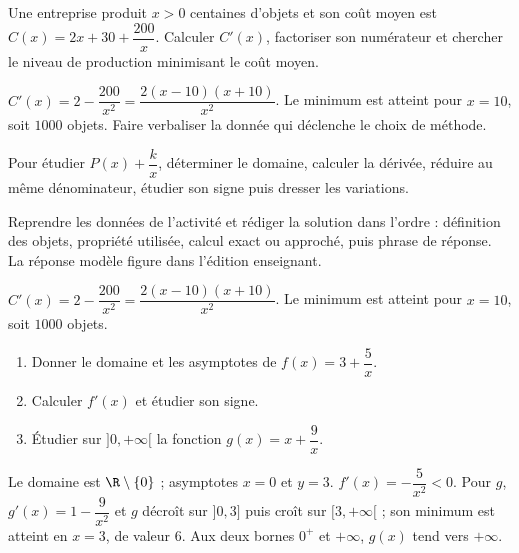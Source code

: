 \begin{activity}
Une entreprise produit $x>0$ centaines d'objets et son coût moyen est $C(x)=2x+30+\dfrac{200}{x}$. Calculer $C'(x)$, factoriser son numérateur et chercher le niveau de production minimisant le coût moyen.

\end{activity}
\begin{solution}$C'(x)=2-\dfrac{200}{x^2}=\dfrac{2(x-10)(x+10)}{x^2}$. Le minimum est atteint pour $x=10$, soit $\num{1000}$ objets. Faire verbaliser la donnée qui déclenche le choix de méthode.\end{solution}

\begin{summary}Pour étudier $P(x)+\dfrac{k}{x}$, déterminer le domaine, calculer la dérivée, réduire au même dénominateur, étudier son signe puis dresser les variations.\end{summary}

\begin{example}
Reprendre les données de l'activité et rédiger la solution dans l'ordre : définition des objets, propriété utilisée, calcul exact ou approché, puis phrase de réponse. La réponse modèle figure dans l'édition enseignant.
\end{example}
\begin{solution}$C'(x)=2-\dfrac{200}{x^2}=\dfrac{2(x-10)(x+10)}{x^2}$. Le minimum est atteint pour $x=10$, soit $\num{1000}$ objets.\end{solution}

\begin{exercise}[essentiel]
\begin{enumerate}\item Donner le domaine et les asymptotes de $f(x)=3+\dfrac{5}x$.\item Calculer $f'(x)$ et étudier son signe.\item Étudier sur $]0,+\infty[$ la fonction $g(x)=x+\dfrac{9}x$.\end{enumerate}
\end{exercise}
\begin{solution}Le domaine est $\R\setminus\{0\}$ ; asymptotes $x=0$ et $y=3$. $f'(x)=-\dfrac{5}{x^2}<0$. Pour $g$, $g'(x)=1-\dfrac{9}{x^2}$ et $g$ décroît sur $]0,3]$ puis croît sur $[3,+\infty[$ ; son minimum est atteint en $x=3$, de valeur $6$. Aux deux bornes $0^+$ et $+\infty$, $g(x)$ tend vers $+\infty$.\end{solution}


